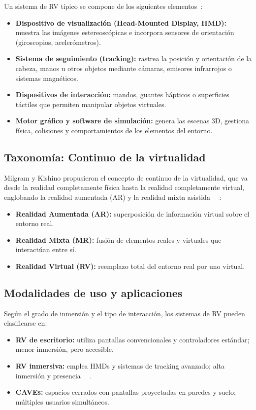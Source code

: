 Un sistema de RV típico se compone de los siguientes elementos~\cite{sherman2002,burdea2003}:
\begin{itemize}
  \item \textbf{Dispositivo de visualización (Head-Mounted Display, HMD):} muestra las imágenes estereoscópicas e incorpora sensores de orientación (giroscopios, acelerómetros).
  \item \textbf{Sistema de seguimiento (tracking):} rastrea la posición y orientación de la cabeza, manos u otros objetos mediante cámaras, emisores infrarrojos o sistemas magnéticos.
  \item \textbf{Dispositivos de interacción:} mandos, guantes hápticos o superficies táctiles que permiten manipular objetos virtuales.
  \item \textbf{Motor gráfico y software de simulación:} genera las escenas 3D, gestiona física, colisiones y comportamientos de los elementos del entorno.
\end{itemize}

\subsection{Taxonomía: Continuo de la virtualidad}

Milgram y Kishino propusieron el concepto de continuo de la virtualidad, que va desde la realidad completamente física hasta la realidad completamente virtual, englobando la realidad aumentada (AR) y la realidad mixta asistida ~~\cite{milgram94}:
\begin{itemize}
  \item \textbf{Realidad Aumentada (AR):} superposición de información virtual sobre el entorno real.
  \item \textbf{Realidad Mixta (MR):} fusión de elementos reales y virtuales que interactúan entre sí.
  \item \textbf{Realidad Virtual (RV):} reemplazo total del entorno real por uno virtual.
\end{itemize}

\subsection{Modalidades de uso y aplicaciones}

Según el grado de inmersión y el tipo de interacción, los sistemas de RV pueden clasificarse en:
\begin{itemize}
  \item \textbf{RV de escritorio:} utiliza pantallas convencionales y controladores estándar; menor inmersión, pero accesible.
  \item \textbf{RV inmersiva:} emplea HMDs y sistemas de tracking avanzado; alta inmersión y presencia ~~\cite{burdea2003}.
  \item \textbf{CAVEs:} espacios cerrados con pantallas proyectadas en paredes y suelo; múltiples usuarios simultáneos.
\end{itemize}


